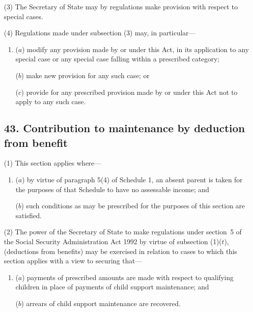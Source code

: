 \documentclass[12pt,a4paper]{article}
\begin{document}
(3) The Secretary of State may by regulations make provision with respect to special cases.

(4) Regulations made under subsection (3)  may, in particular—
\begin{enumerate}\item[]
($a$) modify any provision made by or under this Act, in its application to any special case or any special case falling within a prescribed category;

($b$) make new provision for any such case; or

($c$) provide for any prescribed provision made by or under this Act not to apply to any such case.
\end{enumerate}


\subsection{43. Contribution to maintenance by deduction from benefit}

(1) This section applies where—
\begin{enumerate}\item[]
($a$) by virtue of paragraph 5(4)  of Schedule 1, an absent parent is taken for the purposes of that Schedule to have no assessable income; and

($b$) such conditions as may be prescribed for the purposes of this section are satisfied.
\end{enumerate}

(2) The power of the Secretary of State to make regulations under 
section~5 of the Social Security Administration Act 1992 by virtue of subsection (1)($t$),  %
(deductions from benefits) may be exercised in relation to cases to which this section applies with a view to securing that—
\begin{enumerate}\item[]
($a$) payments of prescribed amounts are made with respect to qualifying children in place of payments of child support maintenance; and

($b$) arrears of child support maintenance are recovered.
\end{enumerate}

\end{document}
